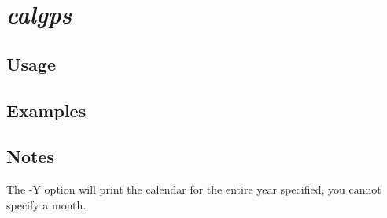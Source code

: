 %
%

\section{\emph{calgps}}
\subsection{Usage}
\subsection{Examples}

\subsection{Notes}
The -Y option will print the calendar for the entire year specified, you cannot specify a month.

%

